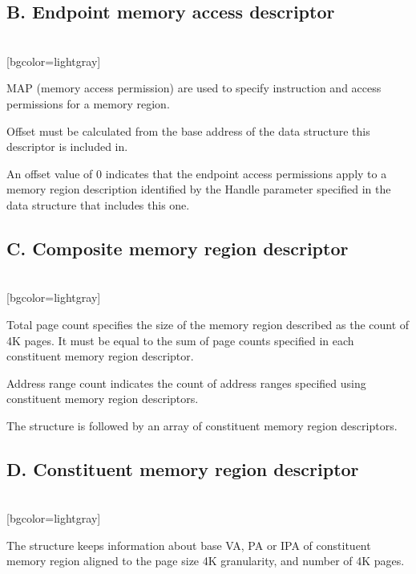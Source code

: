 \documentclass{article}
\begin{document}
\subsection*{B. Endpoint memory access descriptor}

\begin{bytefield}[bitwidth=2.5em]{16}
	\\	
	[bgcolor=lightgray]{}
\end{bytefield}

MAP (memory access permission) are used to specify instruction and access permissions for a memory region.

Offset must be calculated from the base address of
the data structure this descriptor is included in.

An offset value of 0 indicates that the endpoint
access permissions apply to a memory region
description identified by the Handle parameter
specified in the data structure that includes this
one.

\subsection*{C. Composite memory region descriptor}

\begin{bytefield}[bitwidth=2.5em]{16}
	\\	
	[bgcolor=lightgray]{}
\end{bytefield}

Total page count specifies the size of the memory region described as the count
of 4K pages. It must be equal to the sum of page counts specified
in each constituent memory region descriptor.

Address range count indicates the count of address ranges specified using
constituent memory region descriptors.

The structure is followed by an array of constituent memory region descriptors.

\subsection*{D. Constituent memory region descriptor}

\begin{bytefield}[bitwidth=2.5em]{16}
	\\	
	[bgcolor=lightgray]{}
\end{bytefield}

The structure keeps information about base VA, PA or IPA of constituent memory region aligned to
the page size 4K granularity, and number of 4K pages.
\end{document}
